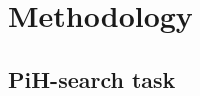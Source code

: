 \documentclass[final,5p,times,twocolumn]{elsarticle}
\begin{document}



\section{Methodology}\label{sec:experiment_methods}

\subsection{PiH-search task}
\end{document}

